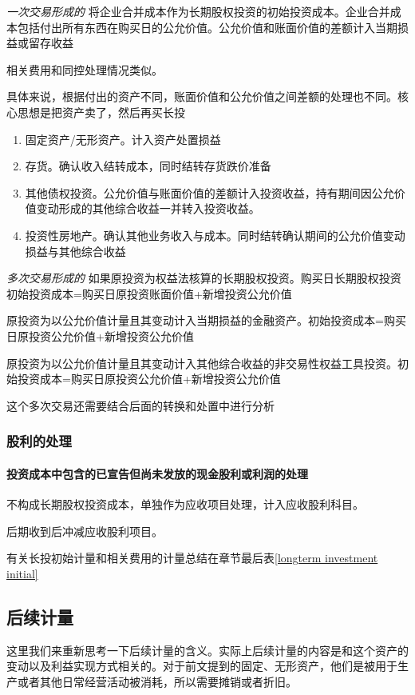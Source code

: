 \documentclass[UTF8,12pt]{ctexart}
\numberwithin{equation}{section} %
\numberwithin{figure}{section}
\numberwithin{table}{section}
\begin{document}
	\textit{一次交易形成的}
	将企业合并成本作为长期股权投资的初始投资成本。企业合并成本包括付出所有东西在购买日的公允价值。公允价值和账面价值的差额计入当期损益或留存收益
	
	相关费用和同控处理情况类似。
	
	具体来说，根据付出的资产不同，账面价值和公允价值之间差额的处理也不同。核心思想是把资产卖了，然后再买长投
	\begin{enumerate}
		\item 固定资产/无形资产。计入资产处置损益
		
		\item 存货。确认收入结转成本，同时结转存货跌价准备
		
		\item 其他债权投资。公允价值与账面价值的差额计入投资收益，持有期间因公允价值变动形成的其他综合收益一并转入投资收益。
		
		\item 投资性房地产。确认其他业务收入与成本。同时结转确认期间的公允价值变动损益与其他综合收益
	\end{enumerate}
	
	\textit{多次交易形成的}
	如果原投资为权益法核算的长期股权投资。购买日长期股权投资初始投资成本=购买日原投资账面价值+新增投资公允价值
	
	原投资为以公允价值计量且其变动计入当期损益的金融资产。初始投资成本=购买日原投资公允价值+新增投资公允价值
	
	原投资为以公允价值计量且其变动计入其他综合收益的非交易性权益工具投资。初始投资成本=购买日原投资公允价值+新增投资公允价值
	
	这个多次交易还需要结合后面的转换和处置中进行分析
	
	\subsubsection{股利的处理}
	\paragraph{投资成本中包含的已宣告但尚未发放的现金股利或利润的处理}
	不构成长期股权投资成本，单独作为应收项目处理，计入应收股利科目。
	
	后期收到后冲减应收股利项目。
	
	
	有关长投初始计量和相关费用的计量总结在章节最后表\ref{longterm investment initial}
	
	
	
	\subsection{后续计量}
	这里我们来重新思考一下后续计量的含义。实际上后续计量的内容是和这个资产的变动以及利益实现方式相关的。对于前文提到的固定、无形资产，他们是被用于生产或者其他日常经营活动被消耗，所以需要摊销或者折旧。
	
\end{document}

